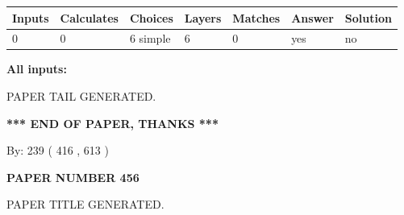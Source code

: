 \documentclass[12pt]{article}
\begin{document}
   
   
   
\noindent\begin{tabular}{|l|l|l|l|l|l|l|}
 \hline
Inputs & Calculates & Choices & Layers & Matches & Answer & Solution \\ \hline
 0  & 
 0  & 
 6
  simple  
  & 
 6  & 
 0  & 
  yes & 
  no 
  \\ \hline
 \end{tabular}
   
   
   
   
\noindent{}
   
   
   
   
\noindent\vspace{0.1in}\hspace{-0.08in} {\textbf{\Large{All inputs: }}}
   
   
   
   
   
   
 \vspace{0.2in}
 
   
   
\vspace{2.0in} PAPER TAIL GENERATED.
   
   
   
   
\vspace{1.0in} 
{\textbf{\large{ *** END OF PAPER, THANKS *** }}} 
   
   
\hspace{1.0in} By: 
 239 ( 416 ,  613 )
   
   
   
   
\newpage 
\setcounter{page}{ 
   456001 } 
   
   
   
   
 {\textbf{ \Large{ PAPER NUMBER  456  }}}
   
   
\vspace{0.2in}
   
   
   
   
   
   
   
   
 \vspace{0.2in}
 
 
 
 
   
   
 PAPER TITLE GENERATED.
   
   
   
\end{document}
